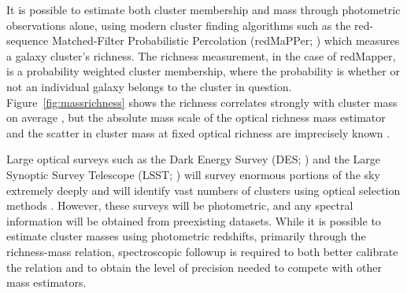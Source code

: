 It is possible to estimate both cluster membership and mass through photometric observations alone, using modern cluster finding algorithms such as the red-sequence Matched-Filter Probabilistic Percolation (redMaPPer; \citealt{Rykoff2014}) which measures a galaxy cluster's richness. The richness measurement, in the case of redMapper, is a probability weighted cluster membership, where the probability is whether or not an individual galaxy belongs to the cluster in question. Figure~\ref{fig:massrichness} shows the richness correlates strongly with cluster mass on average , but the absolute mass scale of the optical richness mass estimator and the scatter in cluster mass at fixed optical richness are imprecisely known \citep{Rykoff2012}.

Large optical surveys such as the Dark Energy Survey (DES; \citealt{DES2005}) and the Large Synoptic Survey Telescope (LSST; \citealt{LSST2012}) will survey enormous portions of the sky extremely deeply and will identify vast numbers of clusters using optical selection methods . However, these surveys will be photometric, and any spectral information will be obtained from preexisting datasets. While it is possible to estimate cluster masses using photometric redshifts, primarily through the richness-mass relation, spectroscopic followup is required to both better calibrate the relation and to obtain the level of precision needed to compete with other mass estimators. 

